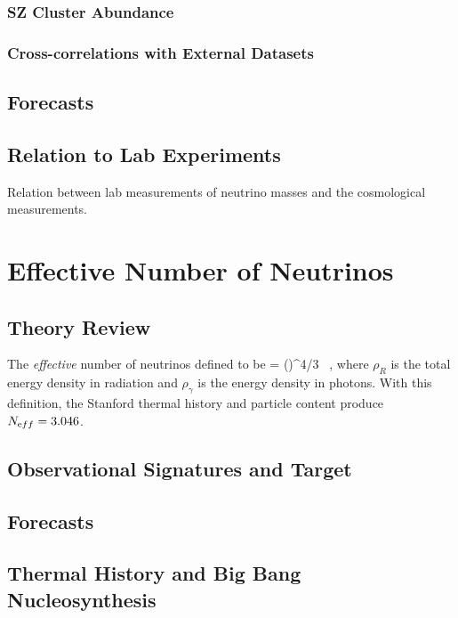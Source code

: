 \subsubsection{SZ Cluster Abundance}
\subsubsection{Cross-correlations with External Datasets}


\subsection{Forecasts}

\subsection{Relation to Lab Experiments}

Relation between lab measurements of neutrino masses and the cosmological measurements.

\section{Effective Number of Neutrinos}

\subsection{Theory Review}

The {\it effective} number of neutrinos defined to be
\beq
\Neff= \left(\right)^{4/3}   \ ,
\eeq
where $\rho_{R}$ is the total energy density in radiation and $\rho_\gamma$ is the energy density in photons. With this definition, the Stanford thermal history and particle content produce $N_{\mathrm eff} = 3.046$.

\subsection{Observational Signatures and Target}

\subsection{Forecasts}

\subsection{Thermal History and Big Bang Nucleosynthesis}

